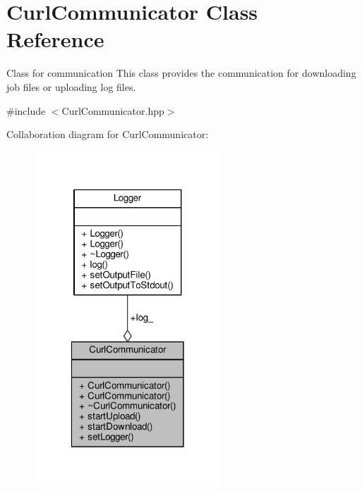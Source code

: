 \hypertarget{classCurlCommunicator}{\section{Curl\-Communicator Class Reference}
\label{classCurlCommunicator}
}


Class for communication This class provides the communication for downloading job files or uploading log files.  




{\ttfamily \#include $<$Curl\-Communicator.\-hpp$>$}



Collaboration diagram for Curl\-Communicator\-:
\nopagebreak
\begin{figure}[H]
\begin{center}
\leavevmode
\includegraphics[width=198pt]{classCurlCommunicator__coll__graph}
\end{center}
\end{figure}
